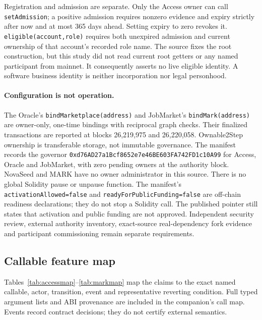 \documentclass[11pt,letterpaper]{article}
\begin{document}
Registration and admission are separate. Only the Access owner can call \texttt{setAdmission}; a positive admission requires nonzero evidence and expiry strictly after now and at most 365 days ahead. Setting expiry to zero revokes it. \texttt{eligible(\allowbreak{}account,\allowbreak{}role)} requires both unexpired admission and current ownership of that account's recorded role name. The source fixes the root construction, but this study did not read current root getters or any named participant from mainnet. It consequently asserts no live eligible identity. A software business identity is neither incorporation nor legal personhood.

\paragraph{Configuration is not operation.}
The Oracle's \texttt{bindMarketplace(\allowbreak{}address)} and JobMarket's \texttt{bindMark(\allowbreak{}address)} are owner-only, one-time bindings with reciprocal graph checks. Their finalized transactions are reported at blocks 26,219,975 and 26,220,058. Ownable2Step ownership is transferable storage, not immutable governance. The manifest records the governor \texttt{0xd76AD27a1Bcf8652e7e46BE603FA742FD1c10A99} for Access, Oracle and JobMarket, with zero pending owners at the authority block. NovaSeed and MARK have no owner administrator in this source. There is no global Solidity pause or unpause function. The manifest's \texttt{activationAllowed=false} and \texttt{readyForPublicFunding=false} are off-chain readiness declarations; they do not stop a Solidity call. The published pointer still states that activation and public funding are not approved. Independent security review, external authority inventory, exact-source real-dependency fork evidence and participant commissioning remain separate requirements.

\subsection{Callable feature map}
Tables~\ref{tab:accessmap}--\ref{tab:markmap} map the claims to the exact named callable, actor, transition, event and representative reverting condition. Full typed argument lists and ABI provenance are included in the companion's call map. Events record contract decisions; they do not certify external semantics.
\end{document}
